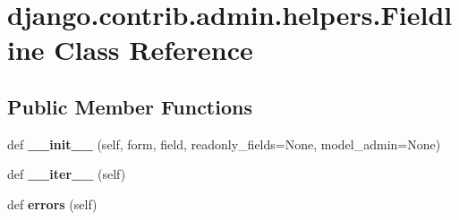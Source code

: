 \hypertarget{classdjango_1_1contrib_1_1admin_1_1helpers_1_1_fieldline}{}\section{django.\+contrib.\+admin.\+helpers.\+Fieldline Class Reference}
\label{classdjango_1_1contrib_1_1admin_1_1helpers_1_1_fieldline}
\subsection*{Public Member Functions}
\begin{DoxyCompactItemize}
\item 
\mbox{\label{classdjango_1_1contrib_1_1admin_1_1helpers_1_1_fieldline_a944c441983980818712171ad1debb5ca}} 
def {\bfseries \+\_\+\+\_\+init\+\_\+\+\_\+} (self, form, field, readonly\+\_\+fields=None, model\+\_\+admin=None)
\item 
\mbox{\label{classdjango_1_1contrib_1_1admin_1_1helpers_1_1_fieldline_a6ab23b5ee0b19ccd17808fd165f315e3}} 
def {\bfseries \+\_\+\+\_\+iter\+\_\+\+\_\+} (self)
\item 
\mbox{\label{classdjango_1_1contrib_1_1admin_1_1helpers_1_1_fieldline_a0913b40069443276d1dd1a8da7309fe5}} 
def {\bfseries errors} (self)
\end{DoxyCompactItemize}
